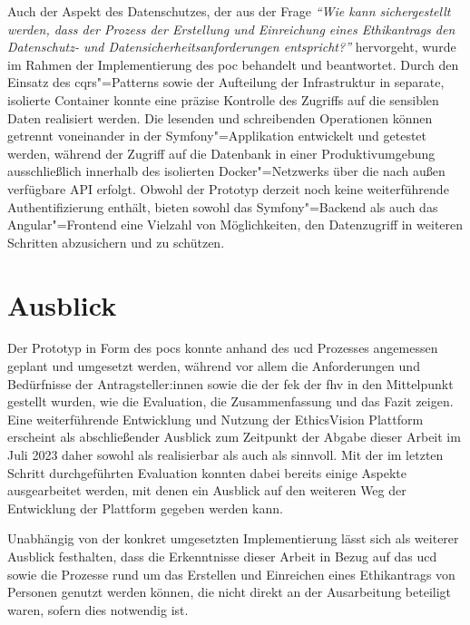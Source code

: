 \documentclass[a4paper,12pt,twoside,numbers=noendperiod]{scrreprt}
\begin{document}
\medskip

Auch der Aspekt des Datenschutzes, der aus der Frage \textit{\enquote{Wie kann sichergestellt werden, dass der Prozess der Erstellung und Einreichung eines Ethikantrags den Datenschutz- und Datensicherheitsanforderungen entspricht?}} hervorgeht, wurde im Rahmen der Implementierung des \acl{poc} behandelt und beantwortet. Durch den Einsatz des \ac{cqrs}"=Patterns sowie der Aufteilung der Infrastruktur in separate, isolierte Container konnte eine präzise Kontrolle des Zugriffs auf die sensiblen Daten realisiert werden. Die lesenden und schreibenden Operationen können getrennt voneinander in der Symfony"=Applikation entwickelt und getestet werden, während der Zugriff auf die Datenbank in einer Produktivumgebung ausschließlich innerhalb des isolierten Docker"=Netzwerks über die nach außen verfügbare API erfolgt. Obwohl der Prototyp derzeit noch keine weiterführende Authentifizierung enthält, bieten sowohl das Symfony"=Backend als auch das Angular"=Frontend eine Vielzahl von Möglichkeiten, den Datenzugriff in weiteren Schritten abzusichern und zu schützen.

\section{Ausblick}
\label{sec:ausblick}

Der Prototyp in Form des \acl{poc}s konnte anhand des \acl{ucd} Prozesses angemessen geplant und umgesetzt werden, während vor allem die Anforderungen und Bedürfnisse der Antragsteller:innen sowie die der \acl{fek} der \acl{fhv} in den Mittelpunkt gestellt wurden, wie die Evaluation, die Zusammenfassung und das Fazit zeigen. Eine weiterführende Entwicklung und Nutzung der EthicsVision Plattform erscheint als abschließender Ausblick zum Zeitpunkt der Abgabe dieser Arbeit im Juli 2023 daher sowohl als realisierbar als auch als sinnvoll. Mit der im letzten Schritt durchgeführten Evaluation konnten dabei bereits einige Aspekte ausgearbeitet werden, mit denen ein Ausblick auf den weiteren Weg der Entwicklung der Plattform gegeben werden kann.

Unabhängig von der konkret umgesetzten Implementierung lässt sich als weiterer Ausblick festhalten, dass die Erkenntnisse dieser Arbeit in Bezug auf das \acl{ucd} sowie die Prozesse rund um das Erstellen und Einreichen eines Ethikantrags von Personen genutzt werden können, die nicht direkt an der Ausarbeitung beteiligt waren, sofern dies notwendig ist.

\cleardoublepage
{}
{}
\printbibliography
\end{document}

